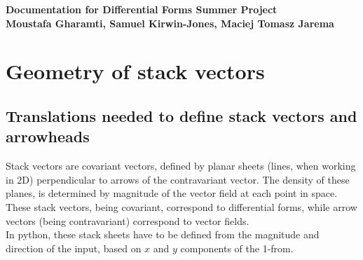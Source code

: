 \documentclass[11]{report}
\begin{document}
\begin{titlepage}
\begin{center}
\vspace*{1cm}
\LARGE
\textbf{Documentation for Differential Forms Summer Project}\\
\vspace{5cm}
\normalsize
\textbf{Moustafa Gharamti, Samuel Kirwin-Jones, Maciej Tomasz Jarema}\\

\end{center}
\end{titlepage}

\section{Geometry of stack vectors}

\subsection{Translations needed to define stack vectors and arrowheads}
Stack vectors are covariant vectors, defined by planar sheets (lines, when working in 2D) perpendicular to arrows of the contravariant vector. The density of these planes, is determined by magnitude of the vector field at each point in space. These stack vectors, being covariant, correspond to differential forms, while arrow vectors (being contravariant) correspond to vector fields.\\
In python, these stack sheets have to be defined from the magnitude and direction of the input, based on \(x\) and \(y\) components of the 1-from.
\end{document}
